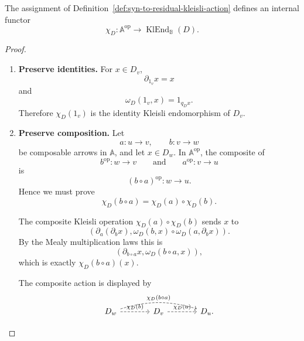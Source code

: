 \begin{theorem}
\label{thm:syn-to-residual-kleisli-action-functorial}
    The assignment of Definition~\ref{def:syn-to-residual-kleisli-action}
    defines an internal functor
    \[
        \chi_D:
        \mathbb A^{\mathrm{op}}
        \to
        \operatorname{KlEnd}_{\mathbb B}(D).
    \]
\end{theorem}

\begin{proof}
    \leavevmode
    \begin{enumerate}
        \item \textbf{Preserve identities.}
        For \(x\in D_v\),
        \[
            \partial_{1_v}x=x
        \]
        and
        \[
            \omega_D(1_v,x)=1_{q_Dx}.
        \]
        Therefore \(\chi_D(1_v)\) is the identity Kleisli endomorphism of
        \(D_v\).

        \item \textbf{Preserve composition.}
        Let
        \[
            a:u\to v,
            \qquad
            b:v\to w
        \]
        be composable arrows in \(\mathbb A\), and let \(x\in D_w\). In
        \(\mathbb A^{\mathrm{op}}\), the composite of
        \[
            b^{\mathrm{op}}:w\to v
            \qquad\text{and}\qquad
            a^{\mathrm{op}}:v\to u
        \]
        is
        \[
            (b\circ a)^{\mathrm{op}}:w\to u.
        \]
        Hence we must prove
        \[
            \chi_D(b\circ a)
            =
            \chi_D(a)\circ\chi_D(b).
        \]

        The composite Kleisli operation \(\chi_D(a)\circ\chi_D(b)\) sends
        \(x\) to
        \[
            \left(
                \partial_a(\partial_bx),
                \omega_D(b,x)\circ\omega_D(a,\partial_bx)
            \right).
        \]
        By the Mealy multiplication laws this is
        \[
            \left(
                \partial_{b\circ a}x,
                \omega_D(b\circ a,x)
            \right),
        \]
        which is exactly \(\chi_D(b\circ a)(x)\).

        The composite action is displayed by
        \[
        \begin{tikzcd}[column sep=large, row sep=large]
            D_w
                \arrow[r, dashed, "{\chi_D(b)}"]
                \arrow[rr, dashed, bend left=16, "{\chi_D(b\circ a)}"]
            &
            D_v
                \arrow[r, dashed, "{\chi_D(a)}"]
            &
            D_u .
        \end{tikzcd}
        \]
    \end{enumerate}
\end{proof}

